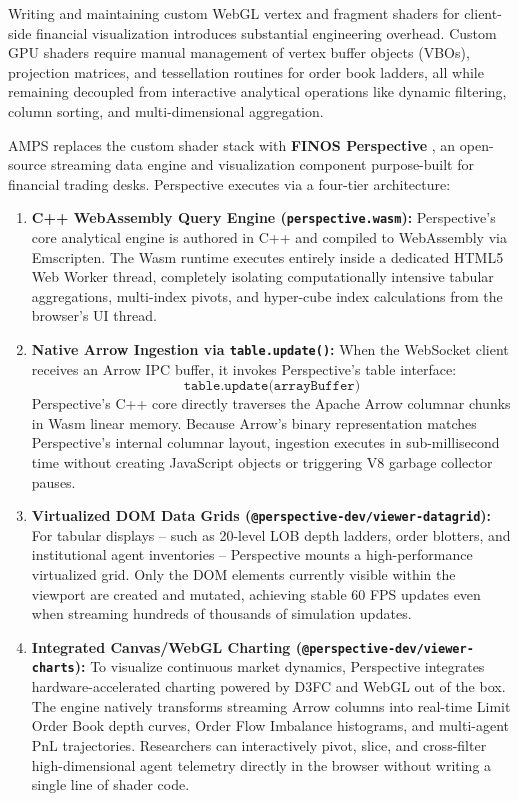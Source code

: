 Writing and maintaining custom WebGL vertex and fragment shaders for client-side financial visualization introduces substantial engineering overhead. Custom GPU shaders require manual management of vertex buffer objects (VBOs), projection matrices, and tessellation routines for order book ladders, all while remaining decoupled from interactive analytical operations like dynamic filtering, column sorting, and multi-dimensional aggregation.

AMPS replaces the custom shader stack with \textbf{FINOS Perspective} \cite{finos_perspective}, an open-source streaming data engine and visualization component purpose-built for financial trading desks. Perspective executes via a four-tier architecture:
\begin{enumerate}
    \item \textbf{C++ WebAssembly Query Engine (\texttt{perspective.wasm}):} Perspective's core analytical engine is authored in C++ and compiled to WebAssembly via Emscripten. The Wasm runtime executes entirely inside a dedicated HTML5 Web Worker thread, completely isolating computationally intensive tabular aggregations, multi-index pivots, and hyper-cube index calculations from the browser's UI thread.
    \item \textbf{Native Arrow Ingestion via \texttt{table.update()}:} When the WebSocket client receives an Arrow IPC buffer, it invokes Perspective's table interface:
    \begin{equation}
        \texttt{table.update(arrayBuffer)}
    \end{equation}
    Perspective's C++ core directly traverses the Apache Arrow columnar chunks in Wasm linear memory. Because Arrow's binary representation matches Perspective's internal columnar layout, ingestion executes in sub-millisecond time without creating JavaScript objects or triggering V8 garbage collector pauses.
    \item \textbf{Virtualized DOM Data Grids (\texttt{@perspective-dev/viewer-datagrid}):} For tabular displays -- such as 20-level LOB depth ladders, order blotters, and institutional agent inventories -- Perspective mounts a high-performance virtualized grid. Only the DOM elements currently visible within the viewport are created and mutated, achieving stable 60 FPS updates even when streaming hundreds of thousands of simulation updates.
    \item \textbf{Integrated Canvas/WebGL Charting (\texttt{@perspective-dev/viewer-charts}):} To visualize continuous market dynamics, Perspective integrates hardware-accelerated charting powered by D3FC and WebGL out of the box. The engine natively transforms streaming Arrow columns into real-time Limit Order Book depth curves, Order Flow Imbalance histograms, and multi-agent PnL trajectories. Researchers can interactively pivot, slice, and cross-filter high-dimensional agent telemetry directly in the browser without writing a single line of shader code.
\end{enumerate}

